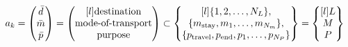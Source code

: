 \begin{equation} 
    a_k = \begin{pmatrix}
    \act{d} \\
    \act{m} \\
    \act{p}    
    \end{pmatrix} =
    \begin{pmatrix*}[l]
    \text{destination} \\
    \text{mode-of-transport} \\
    \text{purpose} \\
    \end{pmatrix*} 
    \subset
    \begin{Bmatrix*}[l]
    \{1,2,\dots, N_L\}, \\
    \{m_{\text{stay}},m_1,\dots,m_{N_m}\}, \\
    \{p_{\text{travel}},p_{\text{end}},p_1,\dots,p_{N_P}\} 
    \end{Bmatrix*}=
    \begin{Bmatrix*}[l]
    L \\
    M \\
    P \\
    \end{Bmatrix*}
\end{equation}
